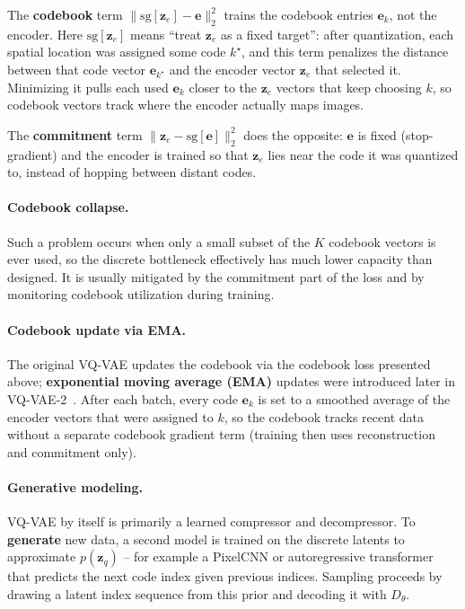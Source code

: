 \documentclass{article}
\begin{document}
The \textbf{codebook} term $\|\mathrm{sg}[\mathbf{z}_e] - \mathbf{e}\|_2^2$ trains the codebook entries $\mathbf{e}_k$, not the encoder.
Here $\mathrm{sg}[\mathbf{z}_e]$ means ``treat $\mathbf{z}_e$ as a fixed target'': after quantization, each spatial location was assigned some code $k^\star$, and this term penalizes the distance between that code vector $\mathbf{e}_{k^\star}$ and the encoder vector $\mathbf{z}_e$ that selected it.
Minimizing it pulls each used $\mathbf{e}_k$ closer to the $\mathbf{z}_e$ vectors that keep choosing $k$, so codebook vectors track where the encoder actually maps images.

The \textbf{commitment} term $\|\mathbf{z}_e - \mathrm{sg}[\mathbf{e}]\|_2^2$ does the opposite: $\mathbf{e}$ is fixed (stop-gradient) and the encoder is trained so that $\mathbf{z}_e$ lies near the code it was quantized to, instead of hopping between distant codes.

\paragraph{Codebook collapse.}
Such a problem occurs when only a small subset of the $K$ codebook vectors is ever used, so the discrete bottleneck effectively has much lower capacity than designed.
It is usually mitigated by the commitment part of the loss and by monitoring codebook utilization during training.

\paragraph{Codebook update via EMA.}
The original VQ-VAE updates the codebook via the codebook loss presented above; \textbf{exponential moving average (EMA)} updates were introduced later in VQ-VAE-2~\cite{vqvae2}.
After each batch, every code $\mathbf{e}_k$ is set to a smoothed average of the encoder vectors that were assigned to $k$, so the codebook tracks recent data without a separate codebook gradient term (training then uses reconstruction and commitment only).

\paragraph{Generative modeling.}
VQ-VAE by itself is primarily a learned compressor and decompressor.
To \textbf{generate} new data, a second model is trained on the discrete latents to approximate $p(\mathbf{z}_q)$ -- for example a PixelCNN or autoregressive transformer that predicts the next code index given previous indices.
Sampling proceeds by drawing a latent index sequence from this prior and decoding it with $D_\theta$.
\end{document}
